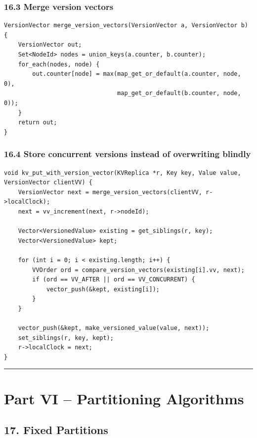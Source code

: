 \documentclass[10pt,letterpaper]{article}
\begin{document}
\subsubsection*{16.3 Merge version vectors}

\begin{verbatim}
VersionVector merge_version_vectors(VersionVector a, VersionVector b) {
    VersionVector out;
    Set<NodeId> nodes = union_keys(a.counter, b.counter);
    for_each(nodes, node) {
        out.counter[node] = max(map_get_or_default(a.counter, node, 0),
                                map_get_or_default(b.counter, node, 0));
    }
    return out;
}
\end{verbatim}

\subsubsection*{16.4 Store concurrent versions instead of overwriting blindly}

\begin{verbatim}
void kv_put_with_version_vector(KVReplica *r, Key key, Value value, VersionVector clientVV) {
    VersionVector next = merge_version_vectors(clientVV, r->localClock);
    next = vv_increment(next, r->nodeId);

    Vector<VersionedValue> existing = get_siblings(r, key);
    Vector<VersionedValue> kept;

    for (int i = 0; i < existing.length; i++) {
        VVOrder ord = compare_version_vectors(existing[i].vv, next);
        if (ord == VV_AFTER || ord == VV_CONCURRENT) {
            vector_push(&kept, existing[i]);
        }
    }

    vector_push(&kept, make_versioned_value(value, next));
    set_siblings(r, key, kept);
    r->localClock = next;
}
\end{verbatim}

\medskip\hrule\medskip

\clearpage
\section*{Part VI -- Partitioning Algorithms}

\subsection*{17. Fixed Partitions}
\end{document}
